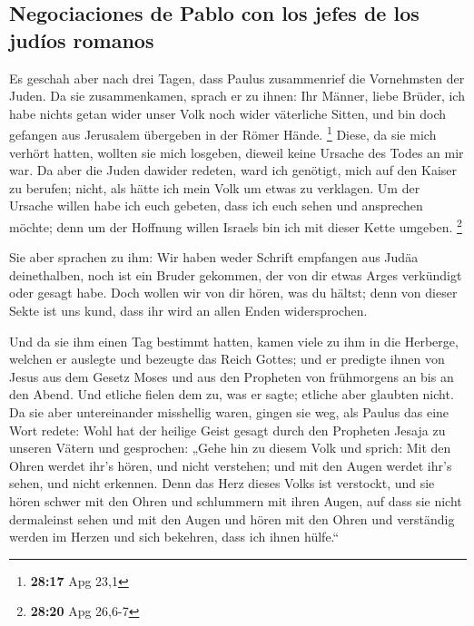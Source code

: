 \hypertarget{negociaciones-de-pablo-con-los-jefes-de-los-juduxedos-romanos}{%
\subsection{Negociaciones de Pablo con los jefes de los judíos
romanos}\label{negociaciones-de-pablo-con-los-jefes-de-los-juduxedos-romanos}}

 Es geschah aber nach drei Tagen, dass Paulus
zusammenrief die Vornehmsten der Juden. Da sie zusammenkamen, sprach er
zu ihnen: Ihr Männer, liebe Brüder, ich habe nichts getan wider unser
Volk noch wider väterliche Sitten, und bin doch gefangen aus Jerusalem
übergeben in der Römer Hände. \footnote{\textbf{28:17} Apg 23,1}
 Diese, da sie mich verhört hatten, wollten sie mich
losgeben, dieweil keine Ursache des Todes an mir war.  Da
aber die Juden dawider redeten, ward ich genötigt, mich auf den Kaiser
zu berufen; nicht, als hätte ich mein Volk um etwas zu verklagen.
 Um der Ursache willen habe ich euch gebeten, dass ich
euch sehen und ansprechen möchte; denn um der Hoffnung willen Israels
bin ich mit dieser Kette umgeben. \footnote{\textbf{28:20} Apg 26,6-7}

 Sie aber sprachen zu ihm: Wir haben weder Schrift
empfangen aus Judäa deinethalben, noch ist ein Bruder gekommen, der von
dir etwas Arges verkündigt oder gesagt habe.  Doch wollen
wir von dir hören, was du hältst; denn von dieser Sekte ist uns kund,
dass ihr wird an allen Enden widersprochen.

 Und da sie ihm einen Tag bestimmt hatten, kamen viele zu
ihm in die Herberge, welchen er auslegte und bezeugte das Reich Gottes;
und er predigte ihnen von Jesus aus dem Gesetz Moses und aus den
Propheten von frühmorgens an bis an den Abend.  Und
etliche fielen dem zu, was er sagte; etliche aber glaubten nicht.
 Da sie aber untereinander misshellig waren, gingen sie
weg, als Paulus das eine Wort redete: Wohl hat der heilige Geist gesagt
durch den Propheten Jesaja zu unseren Vätern  und
gesprochen: „Gehe hin zu diesem Volk und sprich: Mit den Ohren werdet
ihr's hören, und nicht verstehen; und mit den Augen werdet ihr's sehen,
und nicht erkennen.  Denn das Herz dieses Volks ist
verstockt, und sie hören schwer mit den Ohren und schlummern mit ihren
Augen, auf dass sie nicht dermaleinst sehen und mit den Augen und hören
mit den Ohren und verständig werden im Herzen und sich bekehren, dass
ich ihnen hülfe.``

